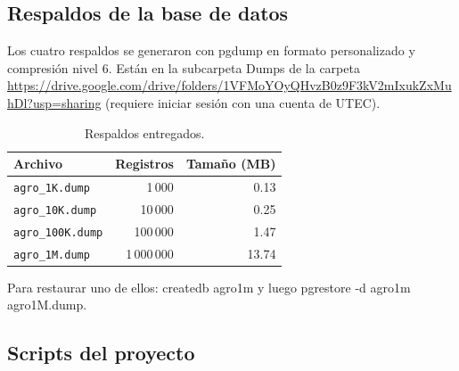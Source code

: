 \documentclass[11pt,letterpaper]{article}
\newcommand{\enlaceDumps}{\url{https://drive.google.com/drive/folders/1VFMoYOyQHvzB0z9F3kV2mIxukZxMuhDl?usp=sharing}}
\newcommand{\tbus}{\textunderscore\allowbreak}
\newcommand{\tb}[1]{{\ttfamily\let\_\tbus #1}}
\begin{document}
\subsection{Respaldos de la base de datos}

Los cuatro respaldos se generaron con \tb{pg\_dump} en formato personalizado y compresión nivel 6. Están en la subcarpeta \tb{Dumps} de la carpeta \enlaceDumps{} (requiere iniciar sesión con una cuenta de UTEC).

\begin{table}[H]
\centering\small
\begin{tabular}{lrr}
\toprule
Archivo & Registros & Tamaño (MB) \\
\midrule
\texttt{agro\_1K.dump} & 1\,000 & 0.13 \\
\texttt{agro\_10K.dump} & 10\,000 & 0.25 \\
\texttt{agro\_100K.dump} & 100\,000 & 1.47 \\
\texttt{agro\_1M.dump} & 1\,000\,000 & 13.74 \\
\bottomrule
\end{tabular}
\caption{Respaldos entregados.}\label{tab:dumps}
\end{table}


Para restaurar uno de ellos: \tb{createdb agro1m} y luego \tb{pg\_restore -d agro1m agro\_1M.dump}.

\subsection{Scripts del proyecto}
\end{document}
